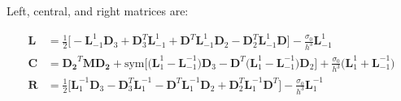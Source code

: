\documentclass[10pt,a4paper]{article}
\begin{document}
Left, central, and right matrices are:

\begin{equation}
\begin{split}
\boldsymbol{L} & = \frac{1}{2}\bigl[-\boldsymbol{L}_{-1}^{1} \boldsymbol{D}_3 + \boldsymbol{D}^{T}_3\boldsymbol{L}_{-1}^{1} +\boldsymbol{D}^T \boldsymbol{L}_{-1}^1 \boldsymbol{D}_2 - \boldsymbol{D}_2^T \boldsymbol{L}_{-1}^{1}  \boldsymbol{D}\bigr] -\frac{\sigma_0}{h^3}\boldsymbol{L}_{-1}^{1}\\ 
\boldsymbol{C} & = \boldsymbol{D_2}^T \boldsymbol{M}\boldsymbol{D_2} + \text{sym}\biggl[\bigl(\boldsymbol{L}_{1}^1 -\boldsymbol{L}_{-1}^{-1}\bigr) \boldsymbol{D}_3-\boldsymbol{D}^T \bigl(\boldsymbol{L}_{1}^1 -\boldsymbol{L}_{-1}^{-1}\bigr)\boldsymbol{D}_2\biggr] + \frac{\sigma_0}{h^3}\bigl(\boldsymbol{L}_{1}^1 +\boldsymbol{L}_{-1}^{-1}\bigr)\\
\boldsymbol{R} & = \frac{1}{2}\bigl[\boldsymbol{L}_{1}^{-1} \boldsymbol{D}_3 - \boldsymbol{D}^{T}_3\boldsymbol{L}_{1}^{-1} -\boldsymbol{D}^T \boldsymbol{L}_{1}^{-1} \boldsymbol{D}_2 + \boldsymbol{D}_2^T \boldsymbol{L}_{1}^{-1}  \boldsymbol{D}^T\bigr] -\frac{\sigma_0}{h^3}\boldsymbol{L}_{1}^{-1}\\
\end{split}
\end{equation}
\end{document}
